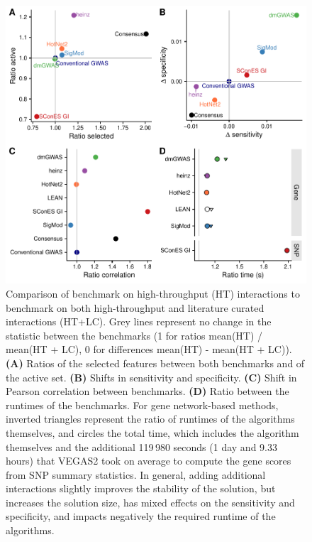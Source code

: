\documentclass[10pt,letterpaper]{article}
\begin{document}
\begin{figure}[htbp]
\centering
\includegraphics[width=.85\linewidth]{./figures/sfigure_8.pdf}
\caption{Comparison of benchmark on high-throughput (HT) interactions to benchmark on both high-throughput and literature curated interactions (HT+LC). Grey lines represent no change in the statistic between the benchmarks (1 for ratios mean(HT) / mean(HT + LC), 0 for differences mean(HT) - mean(HT + LC)). \textbf{(A)} Ratios of the selected features between both benchmarks and of the active set. \textbf{(B)} Shifts in sensitivity and specificity. \textbf{(C)} Shift in Pearson correlation between benchmarks. \textbf{(D)} Ratio between the runtimes of the benchmarks. For gene network-based methods, inverted triangles represent the ratio of runtimes of the algorithms themselves, and circles the total time, which includes the algorithm themselves and the additional 119\,980 seconds (1 day and 9.33 hours) that VEGAS2 took on average to compute the gene scores from SNP summary statistics. In general, adding additional interactions slightly improves the stability of the solution, but increases the solution size, has mixed effects on the sensitivity and specificity, and impacts negatively the required runtime of the algorithms.}
\label{sfig:lc_ht_comparison}
\end{figure}
\end{document}

